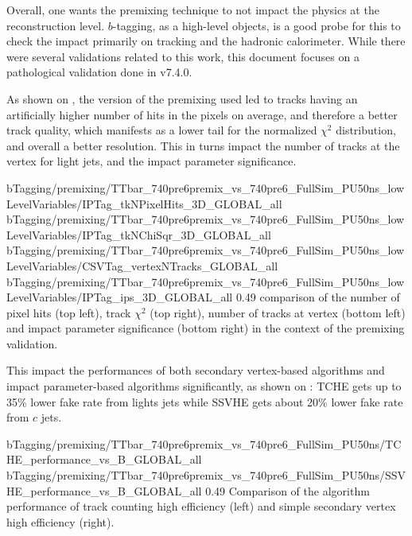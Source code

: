        Overall, one wants the premixing technique to not impact the physics at the reconstruction
        level. $b$-tagging, as a high-level objects, is a good probe for this to check
        the impact primarily on tracking and the hadronic calorimeter. While there were
        several validations related to this work, this document focuses on a pathological
        validation done in v7.4.0.

        As shown on , the version of the
        premixing used led to tracks having an artificially higher number of hits in the
        pixels on average, and therefore a better track quality, which manifests as a lower
        tail for the normalized $\chi^2$ distribution, and overall a better resolution.
        This in turns impact the number of tracks at the vertex for light jets, and the
        impact parameter significance.

                          {bTagging/premixing/TTbar_740pre6premix_vs_740pre6_FullSim_PU50ns_lowLevelVariables/IPTag_tkNPixelHits_3D_GLOBAL_all}
                          {bTagging/premixing/TTbar_740pre6premix_vs_740pre6_FullSim_PU50ns_lowLevelVariables/IPTag_tkNChiSqr_3D_GLOBAL_all}
                          {bTagging/premixing/TTbar_740pre6premix_vs_740pre6_FullSim_PU50ns_lowLevelVariables/CSVTag_vertexNTracks_GLOBAL_all}
                          {bTagging/premixing/TTbar_740pre6premix_vs_740pre6_FullSim_PU50ns_lowLevelVariables/IPTag_ips_3D_GLOBAL_all}
                          {0.49}
                          {comparison of the number of pixel hits (top left), track $\chi^2$
                          (top right), number of tracks at vertex (bottom left) and
                          impact parameter significance (bottom right) in the context
                          of the premixing validation.}

        This impact the performances of both secondary vertex-based algorithms and impact
        parameter-based algorithms significantly, as shown on
         : TCHE gets up to 35\% lower fake
        rate from lights jets while SSVHE gets about 20\% lower fake rate from $c$ jets.

                         {bTagging/premixing/TTbar_740pre6premix_vs_740pre6_FullSim_PU50ns/TCHE_performance_vs_B_GLOBAL_all}
                         {bTagging/premixing/TTbar_740pre6premix_vs_740pre6_FullSim_PU50ns/SSVHE_performance_vs_B_GLOBAL_all}
                         {0.49}
                         {Comparison of the algorithm performance of track counting high
                         efficiency (left) and simple secondary vertex high efficiency (right).}

